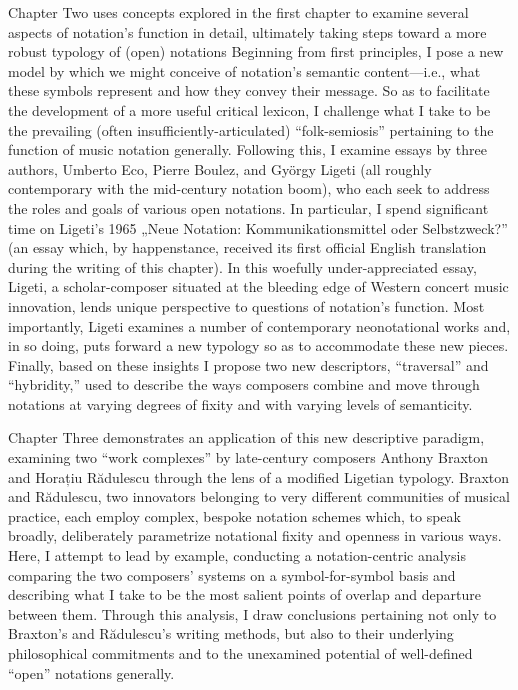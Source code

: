 Chapter Two uses concepts explored in the first chapter to examine several aspects of notation's function in detail, ultimately taking steps toward a more robust typology of (open) notations
Beginning from first principles, I pose a new model by which we might conceive of notation's semantic content---i.e., what these symbols represent and how they convey their message.
So as to facilitate the development of a more useful critical lexicon, I challenge what I take to be the prevailing (often insufficiently-articulated) ``folk-semiosis'' pertaining to the function of music notation generally.
Following this, I examine essays by three authors, Umberto Eco, Pierre Boulez, and Gy\"{o}rgy Ligeti (all roughly contemporary with the mid-century notation boom), who each seek to address the roles and goals of various open notations. 
In particular, I spend significant time on Ligeti's 1965 „Neue Notation: Kommunikationsmittel oder Selbstzweck?” (an essay which, by happenstance, received its first official English translation during the writing of this chapter).
In this woefully under-appreciated essay, Ligeti, a scholar-composer situated at the bleeding edge of Western concert music innovation, lends unique perspective to questions of notation's function.
Most importantly, Ligeti examines a number of contemporary neonotational works and, in so doing, puts forward a new typology so as to accommodate these new pieces.
Finally, based on these insights I propose two new descriptors, ``traversal'' and ``hybridity,'' used to describe the ways composers combine and move through notations at varying degrees of fixity and with varying levels of semanticity. 

Chapter Three demonstrates an application of this new descriptive paradigm, examining two ``work complexes'' by late-century composers Anthony Braxton and Horațiu R\u{a}dulescu through the lens of a modified Ligetian typology.
Braxton and R\u{a}dulescu, two innovators belonging to very different communities of musical practice, each employ complex, bespoke notation schemes which, to speak broadly, deliberately parametrize notational fixity and openness in various ways.
Here, I attempt to lead by example, conducting a notation-centric analysis comparing the two composers' systems on a symbol-for-symbol basis and describing what I take to be the most salient points of overlap and departure between them.
Through this analysis, I draw conclusions pertaining not only to Braxton's and R\u{a}dulescu's writing methods, but also to their underlying philosophical commitments and to the unexamined potential of well-defined ``open'' notations generally.

